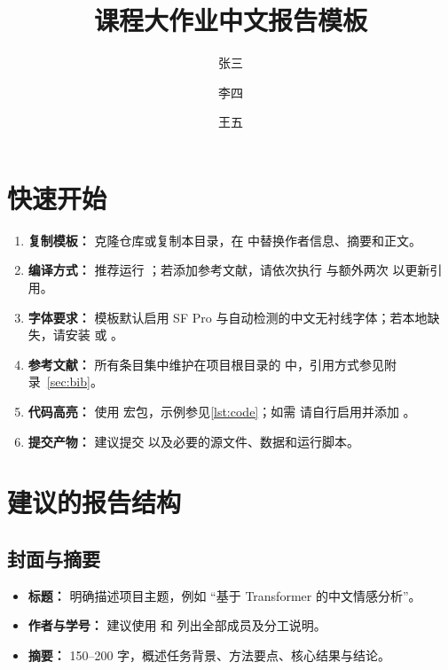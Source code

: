 \documentclass{applemlr}
\title{课程大作业中文报告模板}
\author{张三}
\author{李四}
\author{王五}
\affiliation{上海交通大学自动化与感知学院}
\begin{document}
\maketitle

\tableofcontents
\newpage

\section{快速开始}
\label{sec:quickstart}

\begin{enumerate}
  \item \textbf{复制模板：} 克隆仓库或复制本目录，在  中替换作者信息、摘要和正文。
  \item \textbf{编译方式：} 推荐运行 ；若添加参考文献，请依次执行  与额外两次  以更新引用。
  \item \textbf{字体要求：} 模板默认启用 SF Pro 与自动检测的中文无衬线字体；若本地缺失，请安装  或 。
  \item \textbf{参考文献：} 所有条目集中维护在项目根目录的  中，引用方式参见附录~\ref{sec:bib}。
  \item \textbf{代码高亮：} 使用  宏包，示例参见\autoref{lst:code}；如需  请自行启用并添加 。
  \item \textbf{提交产物：} 建议提交  以及必要的源文件、数据和运行脚本。
\end{enumerate}

\section{建议的报告结构}
\label{sec:structure}

\subsection{封面与摘要}
\begin{itemize}
  \item \textbf{标题：} 明确描述项目主题，例如 ``基于 Transformer 的中文情感分析''。
  \item \textbf{作者与学号：} 建议使用 \code{\string\author} 和 \code{\string\affiliation} 列出全部成员及分工说明。
  \item \textbf{摘要：} 150--200 字，概述任务背景、方法要点、核心结果与结论。
\end{itemize}
\end{document}
